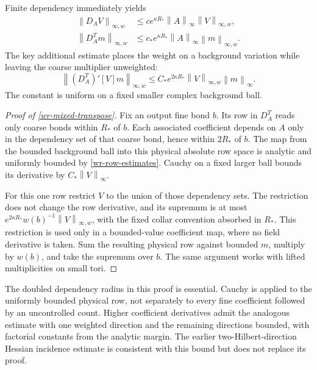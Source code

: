 \documentclass[11pt]{article}
\theoremstyle{remark}\newtheorem{remark}[theorem]{Remark}
\newcommand{\norm}[1]{\left\lVert#1\right\rVert}
\begin{document}
Finite dependency immediately yields
\begin{equation}\label{wr-weighted-rows}
 \begin{split}
 \norm{D_AV}_{\infty,w}
 &\le ce^{\kappa R_*}\norm{A}_\infty\norm{V}_{\infty,w},\\
 \norm{D_A^Tm}_{\infty,w}
 &\le c_*e^{\kappa R_*}\norm{A}_\infty\norm{m}_{\infty,w}.
 \end{split}
\end{equation}
The key additional estimate places the weight on a background
variation while leaving the coarse multiplier unweighted:
\begin{equation}\label{wr-mixed-transpose}
 \boxed{\quad
 \norm{(D_A^T)'[V]m}_{\infty,w}
 \le C_*e^{2\kappa R_*}\norm{V}_{\infty,w}\norm{m}_\infty.
 \quad}
\end{equation}
The constant is uniform on a fixed smaller complex background
ball.

\begin{proof}[Proof of \eqref{wr-mixed-transpose}]
Fix an output fine bond $b$. Its row in $D_A^T$ reads only coarse
bonds within $R_*$ of $b$. Each associated coefficient depends on
$A$ only in the dependency set of that coarse bond, hence within
$2R_*$ of $b$. The map from the bounded background ball into this
physical absolute row space is analytic and uniformly bounded
by \eqref{wr-row-estimates}. Cauchy on a fixed larger ball bounds
its derivative by $C_*\norm{V}_\infty$.

For this one row restrict $V$ to the union of those dependency
sets. The restriction does not change the row derivative, and its
supremum is at most
$e^{2\kappa R_*}w(b)^{-1}\norm{V}_{\infty,w}$, with the fixed
collar convention absorbed in $R_*$. This restriction is used
only in a bounded-value coefficient map, where no field derivative
is taken. Sum the resulting physical row against bounded $m$,
multiply by $w(b)$, and take the supremum over $b$.
The same argument works with lifted multiplicities on small tori.
\end{proof}

The doubled dependency radius in this proof is essential.
Cauchy is applied to the uniformly bounded physical row, not
separately to every fine coefficient followed by an uncontrolled
count. Higher coefficient derivatives admit the analogous estimate
with one weighted direction and the remaining directions bounded,
with factorial constants from the analytic margin. The earlier
two-Hilbert-direction Hessian incidence estimate is consistent
with this bound but does not replace its proof.
\end{document}
